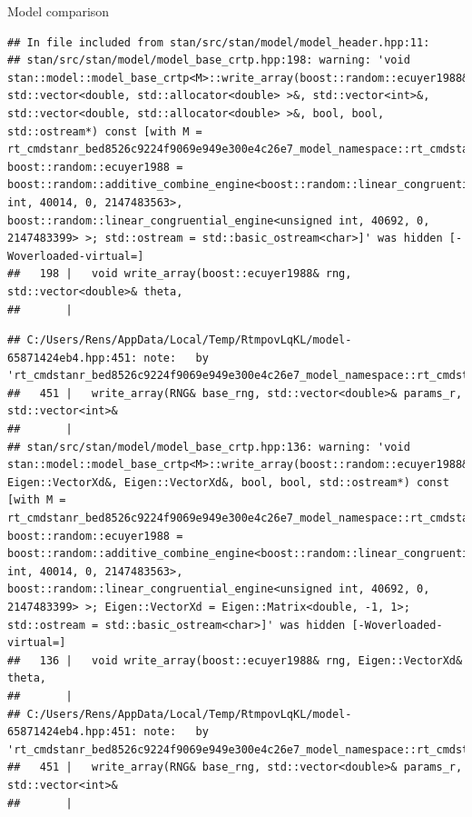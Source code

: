 \documentclass[
  ignorenonframetext,
]{beamer}
\begin{document}
\begin{frame}[fragile]{Model comparison}
\begin{verbatim}
## In file included from stan/src/stan/model/model_header.hpp:11:
## stan/src/stan/model/model_base_crtp.hpp:198: warning: 'void stan::model::model_base_crtp<M>::write_array(boost::random::ecuyer1988&, std::vector<double, std::allocator<double> >&, std::vector<int>&, std::vector<double, std::allocator<double> >&, bool, bool, std::ostream*) const [with M = rt_cmdstanr_bed8526c9224f9069e949e300e4c26e7_model_namespace::rt_cmdstanr_bed8526c9224f9069e949e300e4c26e7_model; boost::random::ecuyer1988 = boost::random::additive_combine_engine<boost::random::linear_congruential_engine<unsigned int, 40014, 0, 2147483563>, boost::random::linear_congruential_engine<unsigned int, 40692, 0, 2147483399> >; std::ostream = std::basic_ostream<char>]' was hidden [-Woverloaded-virtual=]
##   198 |   void write_array(boost::ecuyer1988& rng, std::vector<double>& theta,
##       |
\end{verbatim}

\begin{verbatim}
## C:/Users/Rens/AppData/Local/Temp/RtmpovLqKL/model-65871424eb4.hpp:451: note:   by 'rt_cmdstanr_bed8526c9224f9069e949e300e4c26e7_model_namespace::rt_cmdstanr_bed8526c9224f9069e949e300e4c26e7_model::write_array'
##   451 |   write_array(RNG& base_rng, std::vector<double>& params_r, std::vector<int>&
##       | 
## stan/src/stan/model/model_base_crtp.hpp:136: warning: 'void stan::model::model_base_crtp<M>::write_array(boost::random::ecuyer1988&, Eigen::VectorXd&, Eigen::VectorXd&, bool, bool, std::ostream*) const [with M = rt_cmdstanr_bed8526c9224f9069e949e300e4c26e7_model_namespace::rt_cmdstanr_bed8526c9224f9069e949e300e4c26e7_model; boost::random::ecuyer1988 = boost::random::additive_combine_engine<boost::random::linear_congruential_engine<unsigned int, 40014, 0, 2147483563>, boost::random::linear_congruential_engine<unsigned int, 40692, 0, 2147483399> >; Eigen::VectorXd = Eigen::Matrix<double, -1, 1>; std::ostream = std::basic_ostream<char>]' was hidden [-Woverloaded-virtual=]
##   136 |   void write_array(boost::ecuyer1988& rng, Eigen::VectorXd& theta,
##       | 
## C:/Users/Rens/AppData/Local/Temp/RtmpovLqKL/model-65871424eb4.hpp:451: note:   by 'rt_cmdstanr_bed8526c9224f9069e949e300e4c26e7_model_namespace::rt_cmdstanr_bed8526c9224f9069e949e300e4c26e7_model::write_array'
##   451 |   write_array(RNG& base_rng, std::vector<double>& params_r, std::vector<int>&
##       |
\end{verbatim}


\end{frame}
\end{document}
